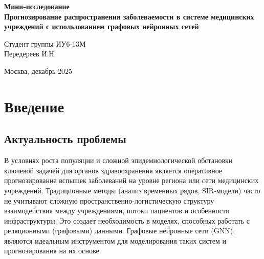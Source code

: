 \documentclass[12pt,a4paper]{article}
\begin{document}
	
	\begin{titlepage}
		\centering
		{\Large\textbf{Мини-исследование}}\\
		\vspace{0.5cm}
		{\LARGE\textbf{Прогнозирование распространения заболеваемости в системе медицинских учреждений с использованием графовых нейронных сетей}}\\
		\vspace{2cm}
		
		{\large Студент группы ИУ6-13М}\\
		{\large Передереев И.Н.}\\
		\vspace{2cm}
		
		{\large Москва, декабрь 2025}\\
	\end{titlepage}
	
	\begin{abstract}
		В данном исследовании разработана и протестирована модель прогнозирования заболеваемости на основе графовых нейронных сетей для сети медицинских учреждений. Исследование направлено на решение актуальной проблемы оперативного прогнозирования вспышек заболеваний с учётом сложной пространственно-логистической структуры взаимодействия между учреждениями. Создан синтетический датасет, моделирующий 50 медицинских учреждений с 300 временными шагами, реализованы и сравнены модели GNN, GNN+LSTM, MLP, ARIMA и изолированные модели. Результаты показывают, что GNN-модель демонстрирует наилучшую точность прогнозирования, подтверждая гипотезу о важности учёта графовой структуры взаимодействий в эпидемиологическом моделировании.
		\textbf{Ключевые слова:} графовые нейронные сети, GNN, прогнозирование заболеваемости, эпидемиологическое моделирование, медицинские учреждения, Graph Convolutional Networks.
	\end{abstract}
	
	\newpage
	
	\tableofcontents
	
	\newpage
	
	\section{Введение}
	\subsection{Актуальность проблемы}
	В условиях роста популяции и сложной эпидемиологической обстановки ключевой задачей для органов здравоохранения является оперативное прогнозирование вспышек заболеваний на уровне региона или сети медицинских учреждений. Традиционные методы (анализ временных рядов, SIR-модели) часто не учитывают сложную пространственно-логистическую структуру взаимодействия между учреждениями, потоки пациентов и особенности инфраструктуры. Это создает необходимость в моделях, способных работать с реляционными (графовыми) данными. Графовые нейронные сети (GNN), являются идеальным инструментом для моделирования таких систем и прогнозирования на их основе.
	
\end{document}
